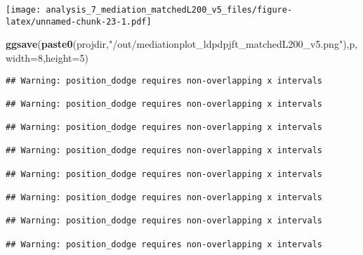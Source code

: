 \documentclass[
]{article}
\newenvironment{Shaded}{\begin{snugshade}}{\end{snugshade}}
\newcommand{\DataTypeTok}[1]{\textcolor[rgb]{0.13,0.29,0.53}{#1}}
\newcommand{\DecValTok}[1]{\textcolor[rgb]{0.00,0.00,0.81}{#1}}
\newcommand{\KeywordTok}[1]{\textcolor[rgb]{0.13,0.29,0.53}{\textbf{#1}}}
\newcommand{\NormalTok}[1]{#1}
\newcommand{\StringTok}[1]{\textcolor[rgb]{0.31,0.60,0.02}{#1}}
\begin{document}
\texttt{[image: analysis\_7\_mediation\_matchedL200\_v5\_files/figure-latex/unnamed-chunk-23-1.pdf]}

\begin{Shaded}
\begin{Highlighting}[]
\KeywordTok{ggsave}\NormalTok{(}\KeywordTok{paste0}\NormalTok{(projdir,}\StringTok{"/out/mediationplot_ldpdpjft_matchedL200_v5.png"}\NormalTok{),p,}\DataTypeTok{width=}\DecValTok{8}\NormalTok{,}\DataTypeTok{height=}\DecValTok{5}\NormalTok{)}
\end{Highlighting}
\end{Shaded}

\begin{verbatim}
## Warning: position_dodge requires non-overlapping x intervals

## Warning: position_dodge requires non-overlapping x intervals

## Warning: position_dodge requires non-overlapping x intervals

## Warning: position_dodge requires non-overlapping x intervals

## Warning: position_dodge requires non-overlapping x intervals

## Warning: position_dodge requires non-overlapping x intervals

## Warning: position_dodge requires non-overlapping x intervals

## Warning: position_dodge requires non-overlapping x intervals
\end{verbatim}
\end{document}
